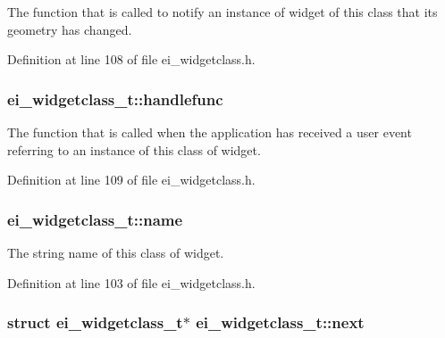 The function that is called to notify an instance of widget of this class that its geometry has changed. 



Definition at line 108 of file ei\-\_\-widgetclass.\-h.

\hypertarget{structei__widgetclass__t_a5ed633370e3c90d21244d93d5467227e}{
\subsubsection[{handlefunc}]{ ei\-\_\-widgetclass\-\_\-t\-::handlefunc}}\label{structei__widgetclass__t_a5ed633370e3c90d21244d93d5467227e}


The function that is called when the application has received a user event referring to an instance of this class of widget. 



Definition at line 109 of file ei\-\_\-widgetclass.\-h.

\hypertarget{structei__widgetclass__t_aa5799b5999890cf04915bf0fe5151ec8}{
\subsubsection[{name}]{ ei\-\_\-widgetclass\-\_\-t\-::name}}\label{structei__widgetclass__t_aa5799b5999890cf04915bf0fe5151ec8}


The string name of this class of widget. 



Definition at line 103 of file ei\-\_\-widgetclass.\-h.

\hypertarget{structei__widgetclass__t_aa184e650475ec2451f033858db1876f0}{
\subsubsection[{next}]{\setlength{\rightskip}{0pt plus 5cm}struct {\bf ei\-\_\-widgetclass\-\_\-t}$\ast$ ei\-\_\-widgetclass\-\_\-t\-::next}}\label{structei__widgetclass__t_aa184e650475ec2451f033858db1876f0}


